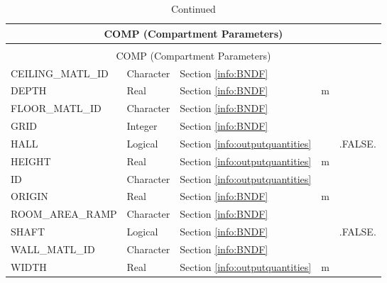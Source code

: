 \vspace{\baselineskip}

\begin{longtable}{@{\extracolsep{\fill}}|l|l|l|l|l|}
\caption[Boundary file parameters ({\ct COMP} namelist group)]{For more information see Section~\ref{info:COMP}.}
\label{tbl:COMP} \\
\hline
\multicolumn{5}{|c|}{{\ct COMP} (Compartment Parameters)} \\
\hline \hline
\endfirsthead
\caption[]{Continued} \\
\hline
\multicolumn{5}{|c|}{{\ct COMP} (Compartment Parameters)} \\
\hline \hline
\endhead
{\ct CEILING\_MATL\_ID}     & Character & Section \ref{info:BNDF}                 &           &                 \\ \hline
{\ct DEPTH}                 & Real      & Section \ref{info:BNDF}                 & m         &  		\\ \hline
{\ct FLOOR\_MATL\_ID}       & Character & Section \ref{info:BNDF}                 &           &                 \\ \hline
{\ct GRID}             & Integer   & Section \ref{info:BNDF}                 &           &                 \\ \hline
{\ct HALL}                  & Logical   & Section \ref{info:outputquantities}     &           & {\ct .FALSE.}   \\ \hline
{\ct HEIGHT}                & Real      & Section \ref{info:outputquantities}     & m         &                 \\ \hline
{\ct ID}                    & Character & Section \ref{info:outputquantities}     &           &                 \\ \hline
{\ct ORIGIN}           & Real      & Section \ref{info:BNDF}                 & m         &                 \\ \hline
{\ct ROOM\_AREA\_RAMP}      & Character & Section \ref{info:BNDF}                 &           &                 \\ \hline
{\ct SHAFT}                 & Logical   & Section \ref{info:BNDF}                 &           & {\ct .FALSE.}   \\ \hline
{\ct WALL\_MATL\_ID}        & Character & Section \ref{info:BNDF}                 &           &                 \\ \hline
{\ct WIDTH}                 & Real      & Section \ref{info:outputquantities}     & m         &                 \\ \hline
\end{longtable}

